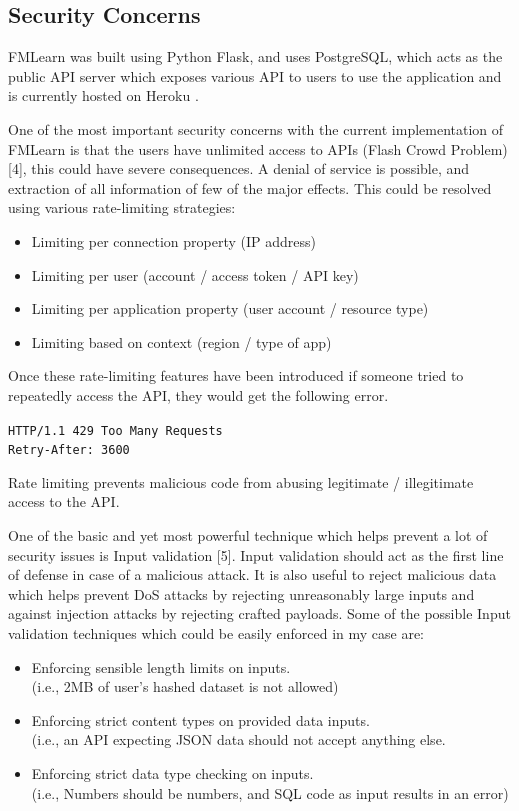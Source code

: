 \subsection{Security Concerns}

FMLearn was built using Python Flask, and uses PostgreSQL, which acts as the public API server which exposes various API to users to use the application and is currently hosted on Heroku .

One of the most important security concerns with the current implementation of FMLearn is that the users have unlimited access to APIs (Flash Crowd Problem) [4], this could have severe consequences. A denial of service is possible, and extraction of all information of few of the major effects. This could be resolved using various rate-limiting strategies:

\begin{itemize} 
    \item Limiting per connection property (IP address)
    \item Limiting per user (account / access token / API key)
    \item Limiting per application property (user account / resource type)
    \item Limiting based on context (region / type of app)
\end{itemize}

Once these rate-limiting features have been introduced if someone tried to repeatedly access the API, they would get the following error.

\quad\quad\quad\quad\quad\quad\quad\quad\quad\quad\quad\quad\quad
\texttt{HTTP/1.1 429 Too Many Requests}\\
\quad\quad\quad\quad\quad\quad\quad\quad\quad\quad\quad\quad\quad
\texttt{Retry-After: 3600}


Rate limiting prevents malicious code from abusing legitimate / illegitimate access to the API.

One of the basic and yet most powerful technique which helps prevent a lot of security issues is Input validation [5]. Input validation should act as the first line of defense in case of a malicious attack. It is also useful to reject malicious data which helps prevent DoS attacks by rejecting unreasonably large inputs and against injection attacks by rejecting crafted payloads. Some of the possible Input validation techniques which could be easily enforced in my case are:

\begin{itemize}
    \item Enforcing sensible length limits on inputs.\\
    (i.e., 2MB of user’s hashed dataset is not allowed)
    \item Enforcing strict content types on provided data inputs.\\
    (i.e., an API expecting JSON data should not accept anything else.
    \item Enforcing strict data type checking on inputs.\\
    (i.e., Numbers should be numbers, and SQL code as input results in an error)
\end{itemize}

